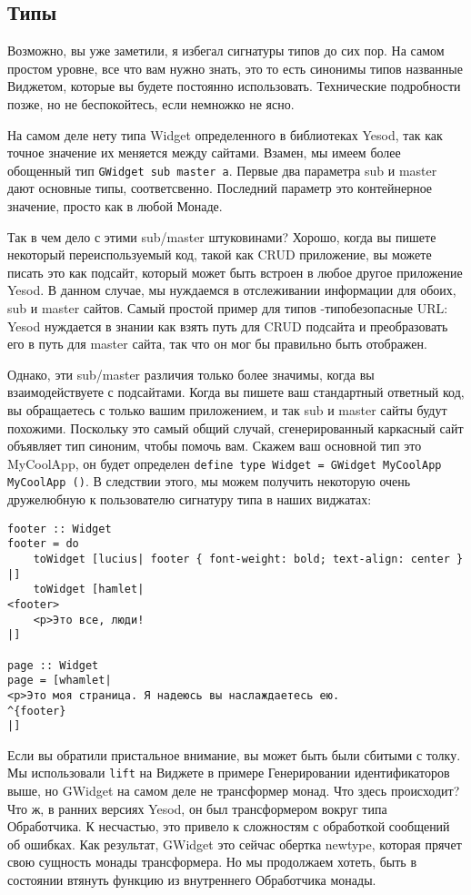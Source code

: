 \subsection{Типы}

Возможно, вы уже заметили, я избегал сигнатуры типов до сих пор. На самом простом уровне, все что вам нужно знать, это то есть синонимы типов названные Виджетом, которые вы будете постоянно использовать. Технические подробности позже, но не беспокойтесь, если немножко не ясно.

На самом деле нету типа Widget определенного в библиотеках Yesod, так как точное значение их меняется между сайтами. Взамен, мы имеем более обощенный тип \lstinline'GWidget sub master a'. Первые два параметра sub и master дают основные типы, соответсвенно. Последний параметр это контейнерное значение, просто как в любой Монаде.

Так в чем дело с этими sub/master штуковинами? Хорошо, когда вы пишете некоторый переиспользуемый код, такой как CRUD приложение, вы можете писать это как подсайт, который может быть встроен в любое другое приложение Yesod. В данном случае, мы нуждаемся в отслеживании информации для обоих, sub и master сайтов. Самый простой пример для типов -типобезопасные URL: Yesod нуждается в знании как взять путь для CRUD подсайта и преобразовать его в путь для master сайта, так что он мог бы правильно быть отображен.

Однако, эти sub/master различия только более значимы, когда вы взаимодействуете с подсайтами. Когда вы пишете ваш стандартный ответный код, вы обращаетесь с только вашим приложением, и так sub и master сайты будут похожими. Поскольку это самый общий случай, сгенерированный каркасный сайт объявляет тип синоним, чтобы помочь вам. Скажем ваш основной тип это MyCoolApp, он будет определен \lstinline'define type Widget = GWidget MyCoolApp MyCoolApp ()'. В следствии этого, мы можем получить некоторую очень дружелюбную к пользователю сигнатуру типа в наших виджатах:

\begin{lstlisting}
footer :: Widget
footer = do
    toWidget [lucius| footer { font-weight: bold; text-align: center } |]
    toWidget [hamlet|
<footer>
    <p>Это все, люди!
|]

page :: Widget
page = [whamlet|
<p>Это моя страница. Я надеюсь вы наслаждаетесь ею.
^{footer}
|]
\end{lstlisting}

Если вы обратили пристальное внимание, вы может быть были сбитыми с толку. Мы использовали \lstinline'lift' на Виджете в примере Генерировании идентификаторов выше, но GWidget на самом деле не трансформер монад. Что здесь происходит? Что ж, в ранних версиях Yesod, он был трансформером вокруг типа Обработчика. К несчастью, это привело к сложностям с обработкой сообщений об ошибках. Как результат, GWidget это сейчас обертка newtype, которая прячет свою сущность монады трансформера. Но мы продолжаем хотеть, быть в состоянии втянуть функцию из внутреннего Обработчика монады.

